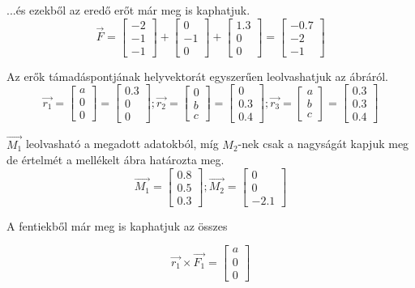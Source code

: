 ...és ezekből az eredő erőt már meg is kaphatjuk. 
$$
\vec{F} = 
\begin{bmatrix} -2 \\ -1 \\ -1 \end{bmatrix} + 
\begin{bmatrix} 0 \\ -1 \\ 0 \end{bmatrix} + 
\begin{bmatrix} 1.3 \\ 0 \\ 0 \end{bmatrix}
= \begin{bmatrix} -0.7 \\ -2 \\ -1 \end{bmatrix} 
$$

Az erők támadáspontjának helyvektorát egyszerűen leolvashatjuk az ábráról.
$$
\vec{r_1} = \begin{bmatrix} a \\ 0 \\ 0 \end{bmatrix} = \begin{bmatrix} 0.3 \\ 0 \\ 0 \end{bmatrix};
\vec{r_2} = \begin{bmatrix} 0 \\ b \\ c \end{bmatrix} = \begin{bmatrix} 0 \\ 0.3 \\ 0.4 \end{bmatrix};
\vec{r_3} = \begin{bmatrix} a \\ b \\ c \end{bmatrix} = \begin{bmatrix} 0.3 \\ 0.3 \\ 0.4 \end{bmatrix}
$$

$\vec{M_1}$ leolvasható a megadott adatokból, míg ${M_2}$-nek csak a nagyságát kapjuk meg de értelmét a mellékelt ábra határozta meg.
$$
\vec{M_1} = \begin{bmatrix} 0.8 \\ 0.5 \\ 0.3 \end{bmatrix};
\vec{M_2} = \begin{bmatrix} 0 \\ 0 \\ -2.1 \end{bmatrix}
$$

A fentiekből már meg is kaphatjuk az összes %

$$
\vec{r_1} \times \vec{F_1} = \begin{bmatrix} a \\ 0 \\ 0 \end{bmatrix}
$$
